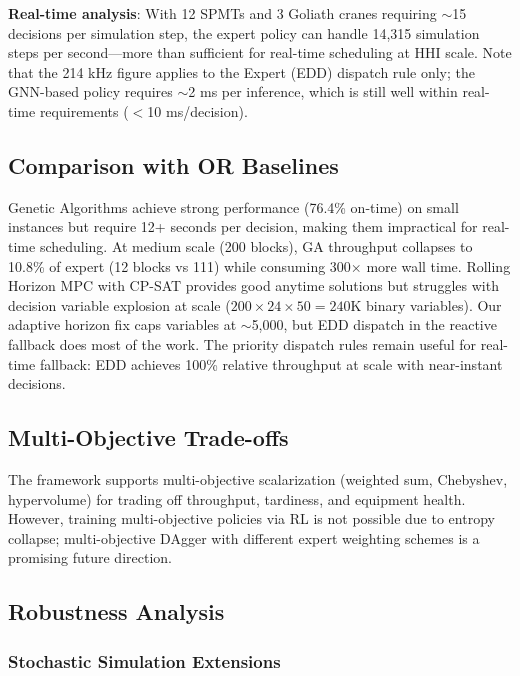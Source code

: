 \documentclass[11pt,a4paper]{article}
\begin{document}
\textbf{Real-time analysis}: With 12 SPMTs and 3 Goliath cranes requiring $\sim$15 decisions per simulation step, the expert policy can handle 14,315 simulation steps per second---more than sufficient for real-time scheduling at HHI scale. Note that the 214 kHz figure applies to the Expert (EDD) dispatch rule only; the GNN-based policy requires $\sim$2 ms per inference, which is still well within real-time requirements ($<$10 ms/decision).

\subsection{Comparison with OR Baselines}

Genetic Algorithms achieve strong performance (76.4\% on-time) on small instances but require 12+ seconds per decision, making them impractical for real-time scheduling. At medium scale (200 blocks), GA throughput collapses to 10.8\% of expert (12 blocks vs 111) while consuming 300$\times$ more wall time. Rolling Horizon MPC with CP-SAT provides good anytime solutions but struggles with decision variable explosion at scale ($200 \times 24 \times 50 = 240$K binary variables). Our adaptive horizon fix caps variables at $\sim$5,000, but EDD dispatch in the reactive fallback does most of the work. The priority dispatch rules remain useful for real-time fallback: EDD achieves 100\% relative throughput at scale with near-instant decisions.

\subsection{Multi-Objective Trade-offs}

The framework supports multi-objective scalarization (weighted sum, Chebyshev, hypervolume) for trading off throughput, tardiness, and equipment health. However, training multi-objective policies via RL is not possible due to entropy collapse; multi-objective DAgger with different expert weighting schemes is a promising future direction.

\subsection{Robustness Analysis}

\subsubsection{Stochastic Simulation Extensions}
\end{document}
